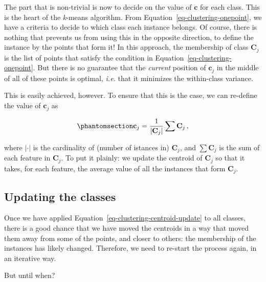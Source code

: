 \documentclass[
  letterpaper,
]{scrbook}
\begin{document}
The part that is non-trivial is now to decide on the value of
\(\mathbf{c}\) for each class. This is the heart of the \emph{k}-means
algorithm. From Equation~\ref{eq-clustering-onepoint}, we have a
criteria to decide to which class each instance belongs. Of course,
there is nothing that prevents us from using this in the opposite
direction, to define the instance by the points that form it! In this
approach, the membership of class \(\mathbf{C}_j\) is the list of points
that satisfy the condition in Equation~\ref{eq-clustering-onepoint}. But
there is no guarantee that the \emph{current} position of
\(\mathbf{c}_j\) in the middle of all of these points is optimal,
\emph{i.e.} that it minimizes the within-class variance.

This is easily achieved, however. To ensure that this is the case, we
can re-define the value of \(\mathbf{c}_j\) as

\begin{equation}\phantomsection\label{eq-clustering-centroid-update}{
\mathbf{c}_j = \frac{1}{|\mathbf{C}_j|}\sum\mathbf{C}_j \,,
}\end{equation}

where \(|\cdot|\) is the cardinality of (number of istances in)
\(\mathbf{C}_j\), and \(\sum \mathbf{C}_j\) is the sum of each feature
in \(\mathbf{C}_j\). To put it plainly: we update the centroid of
\(\mathbf{C}_j\) so that it takes, for each feature, the average value
of all the instances that form \(\mathbf{C}_j\).

\subsection{Updating the classes}\label{updating-the-classes}


Once we have applied Equation~\ref{eq-clustering-centroid-update} to all
classes, there is a good chance that we have moved the centroids in a
way that moved them away from some of the points, and closer to others:
the membership of the instances has likely changed. Therefore, we need
to re-start the process again, in an iterative way.

But until when?
\end{document}

